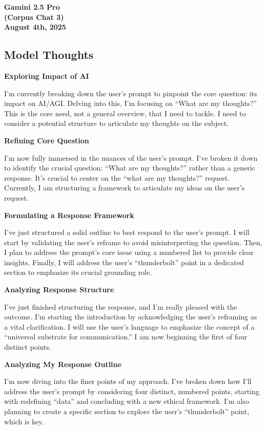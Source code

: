 \documentclass{article}
\begin{document}
\begin{center}
\textbf{Gamini 2.5 Pro} \\
\textbf{(Corpus Chat 3)} \\
\textbf{August 4th, 2025}
\end{center}



\subsection*{Model Thoughts}\label{model-thoughts}

\textbf{Exploring Impact of AI}

I'm currently breaking down the user's prompt to pinpoint the core
question: its impact on AI/AGI. Delving into this, I'm focusing on
``What are my thoughts?'' This is the core need, not a general overview,
that I need to tackle. I need to consider a potential structure to
articulate my thoughts on the subject.

\textbf{Refining Core Question}

I'm now fully immersed in the nuances of the user's prompt. I've broken
it down to identify the crucial question: ``What are my thoughts?''
rather than a generic response. It's crucial to center on the ``what are
my thoughts?'' request. Currently, I am structuring a framework to
articulate my ideas on the user's request.

\textbf{Formulating a Response Framework}

I've just structured a solid outline to best respond to the user's
prompt. I will start by validating the user's reframe to avoid
misinterpreting the question. Then, I plan to address the prompt's core
issue using a numbered list to provide clear insights. Finally, I will
address the user's ``thunderbolt'' point in a dedicated section to
emphasize its crucial grounding role.

\textbf{Analyzing Response Structure}

I've just finished structuring the response, and I'm really pleased with
the outcome. I'm starting the introduction by acknowledging the user's
reframing as a vital clarification. I will use the user's language to
emphasize the concept of a ``universal substrate for communication.'' I
am now beginning the first of four distinct points.

\textbf{Analyzing My Response Outline}

I'm now diving into the finer points of my approach. I've broken down
how I'll address the user's prompt by considering four distinct,
numbered points, starting with redefining ``data'' and concluding with a
new ethical framework. I'm also planning to create a specific section to
explore the user's ``thunderbolt'' point, which is key.
\end{document}
